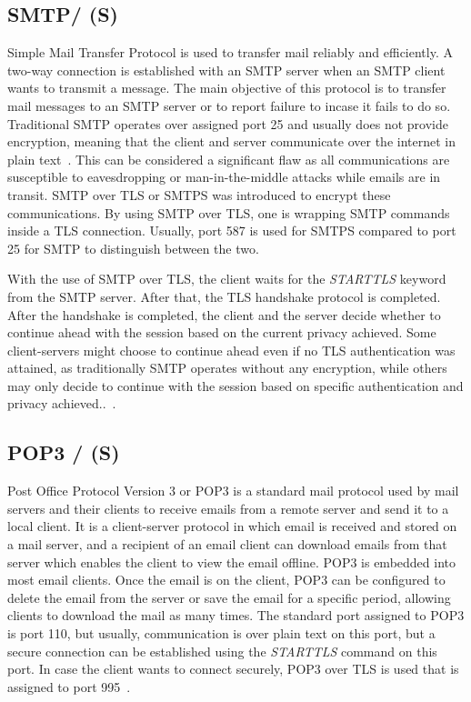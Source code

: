 \subsection{SMTP/ (S)}
Simple Mail Transfer Protocol is used to transfer mail reliably and efficiently. A two-way connection is established with an SMTP server when an SMTP client wants to transmit a message. The main objective of this protocol is to transfer mail messages to an SMTP server 
or to report failure to incase it fails to do so. Traditional SMTP operates over assigned port 25 and usually does not provide encryption, meaning that the client and server communicate over the internet in plain text~\cite{rfc5321}. This can be considered a significant flaw as 
all communications are susceptible to eavesdropping or man-in-the-middle attacks while emails are in transit. 
SMTP over TLS or SMTPS was introduced to encrypt these communications. By using SMTP over TLS, one is wrapping SMTP commands inside 
a TLS connection. Usually, port 587 is used for SMTPS compared to port 25 for SMTP to distinguish between the two.

\noindent With the use of SMTP over TLS, the client waits for the \textit{STARTTLS} keyword from the SMTP server. After that, the TLS handshake 
protocol is completed. After the handshake is completed, the client and the server decide whether to continue ahead with the session based 
on the current privacy achieved. Some client-servers might choose to continue ahead even if no TLS authentication was attained, as traditionally 
SMTP operates without any encryption, while others may only decide to continue with the session based on specific authentication and 
privacy achieved..~\cite{rfc2487}.

\subsection{POP3 / (S)}
Post Office Protocol Version 3 or POP3 is a standard mail protocol used by mail servers and their clients to receive emails from a remote 
server and send it to a local client. It is a client-server protocol in which email is received and stored on a mail server, and a recipient of an email client 
can download emails from that server which enables the client to view the email offline. POP3 is embedded into most email clients. Once the 
email is on the client, POP3 can be configured to delete the email from the server or save the email for a specific period, allowing 
clients to download the mail as many times. The standard port assigned to POP3 is port 110, but usually, communication is over 
plain text on this port, but a secure connection can be established using the \textit{STARTTLS} command on this port. In case the client wants to 
connect securely, POP3 over TLS is used that is assigned to port 995~\cite{rfc1939}.

